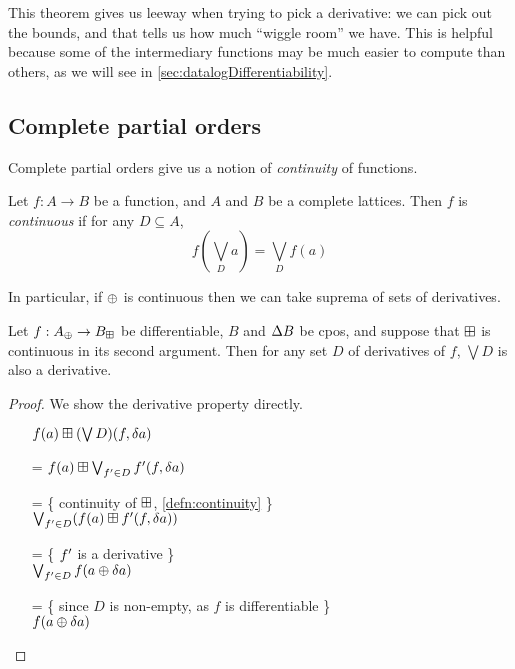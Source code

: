 This theorem gives us leeway when trying to pick a derivative: we can pick out the
bounds, and that tells us how much ``wiggle room'' we have. This is helpful
because some of the intermediary functions may be much easier to compute than
others, as we will see in \cref{sec:datalogDifferentiability}.

\subsection{Complete partial orders}

Complete partial orders give us a notion of \emph{continuity} of functions.

\begin{defn}[Continuity]
\label{defn:continuity}
  Let $f: A \rightarrow B$ be a function, and $A$ and $B$ be a
  complete lattices. Then $f$ is \textit{continuous} if for any $D \subseteq A$,
  $$f(\bigvee_D a) = \bigvee_D f(a)$$
\end{defn}

In particular, if $\oplus$ is continuous then we can take suprema of sets of derivatives.

\begin{prop}
\label{prop:supDerivatives}
  Let $f: A_\oplus \rightarrow B_\boxplus$ be differentiable, $B$ and
  $\Delta B$ be cpos, and suppose that $\boxplus$ is continuous
  in its second argument. Then for any set $D$ of derivatives of $f$, $\bigvee
  D$ is also a derivative.
\end{prop}
\ifproofs
\begin{proof}
  We show the derivative property directly.
  \begin{itemize}
    \item[ ]$f(a) \boxplus (\bigvee D)(f, \delta a)$
    \item[=]$f(a) \boxplus \bigvee_{f' \in D} f'(f, \delta a)$
    \item[=]\{ continuity of $\boxplus$, \cref{defn:continuity} \}\\
      $\bigvee_{f' \in D} (f(a) \boxplus f'(f, \delta a))$
    \item[=]\{ $f'$ is a derivative \}\\
      $\bigvee_{f' \in D} f(a \oplus \delta a)$
    \item[=]\{ since $D$ is non-empty, as $f$ is differentiable \}\\
      $f(a \oplus \delta a)$
  \end{itemize}
\end{proof}
\fi

